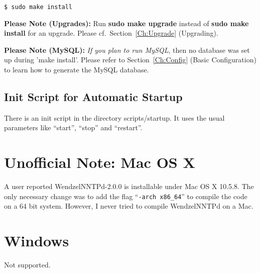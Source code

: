 \begin{verbatim}
$ sudo make install
\end{verbatim}

\textbf{Please Note (Upgrades):} Run \textbf{sudo make upgrade} instead of \textbf{sudo make install} for an upgrade. Please cf.\ Section~\ref{Ch:Upgrade} (Upgrading).

\textbf{Please Note (MySQL):} \textit{If you plan to run MySQL}, then no database was set up during 'make install'. Please refer to Section~\ref{Ch:Config} (Basic Configuration) to learn how to generate the MySQL database.

\subsection{Init Script for Automatic Startup}

There is an init script in the directory scripts/startup. It uses the usual parameters like ``start'', ``stop'' and ``restart''.

\section{Unofficial Note: Mac OS X}

A user reported WendzelNNTPd-2.0.0 is installable under Mac OS X 10.5.8. The only necessary change was to add the flag ``\texttt{-arch x86\_64}'' to compile the code on a 64 bit system. However, I never tried to compile WendzelNNTPd on a Mac.

\section{Windows}

Not supported.


